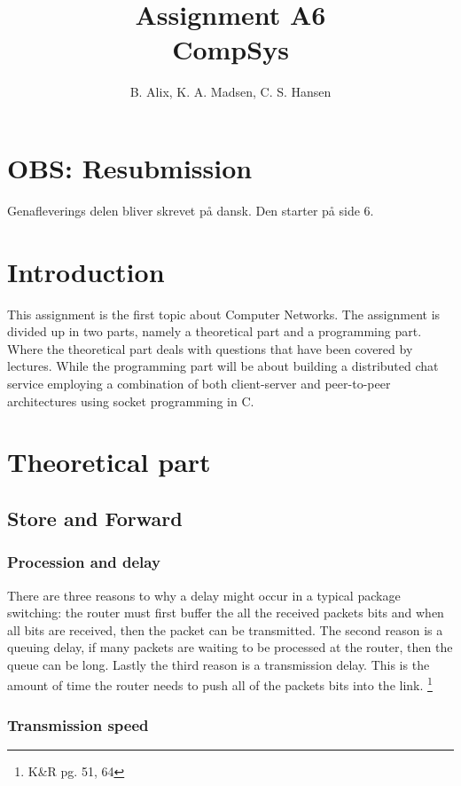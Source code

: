 \documentclass[12pt,a4paper]{article}
\author{B. Alix, K. A. Madsen, C. S. Hansen}
\title{Assignment A6 \\ CompSys}
\begin{document}
\clearpage\maketitle
\thispagestyle{empty}
\setcounter{page}{0}
\newpage


\section{OBS: Resubmission}
Genafleverings delen bliver skrevet på dansk. Den starter på side 6.

\section{Introduction}
This assignment is the first topic about Computer Networks. The assignment is divided up in two parts, namely a theoretical part and a programming part. Where the theoretical part deals with questions that have been covered by lectures. While the programming part will be about building a distributed chat service employing a combination of both client-server and peer-to-peer architectures using socket programming in C.

\section{Theoretical part}
\subsection{Store and Forward}
\subsubsection{Procession and delay}

There are three reasons to why a delay might occur in a typical package switching: the router must first buffer the all the received packets bits and when all bits are received, then the packet can be transmitted. The second reason is a queuing delay, if many packets are waiting to be processed at the router, then the queue can be long. Lastly the third reason is a transmission delay. This is the amount of time the router needs to push all of the packets bits into the link. \footnote{K\&R pg. 51, 64}

\subsubsection{Transmission speed}
\end{document}
